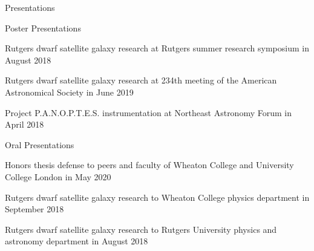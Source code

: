 \documentclass{resume} %
\begin{document}
\begin{rSection}{Presentations}
\begin{rSubsection}{Poster Presentations}{}{}{}
\item Rutgers dwarf satellite galaxy research at Rutgers summer research symposium in August 2018
\item Rutgers dwarf satellite galaxy research at 234th meeting of the American Astronomical Society in June 2019
\item Project P.A.N.O.P.T.E.S. instrumentation at Northeast Astronomy Forum in April 2018
\end{rSubsection}
\begin{rSubsection}{Oral Presentations}{}{}{}
\item Honors thesis defense to peers and faculty of Wheaton College and University College London in May 2020
\item Rutgers dwarf satellite galaxy research to Wheaton College physics department in September 2018
\item Rutgers dwarf satellite galaxy research to Rutgers University physics and astronomy department in August 2018
\end{rSubsection}
\end{rSection}
\end{document}
